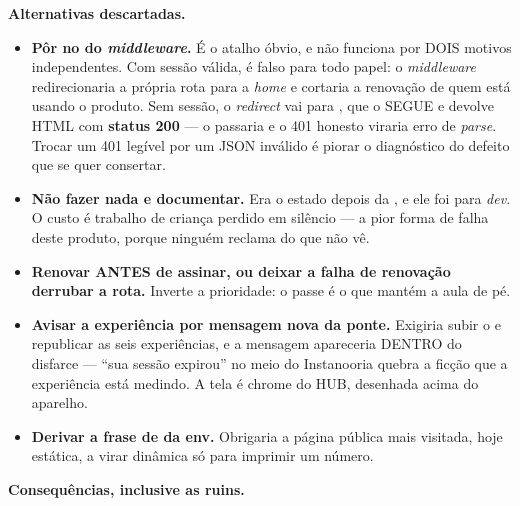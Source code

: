 \textbf{Alternativas descartadas.}
\begin{itemize}
  \item \textbf{Pôr  no  do
    \emph{middleware}.} É o atalho óbvio, e não funciona por DOIS motivos
    independentes. Com sessão válida,  é falso para todo papel: o \emph{middleware}
    redirecionaria a própria rota para a \emph{home} e cortaria a renovação de
    quem está usando o produto. Sem sessão, o \emph{redirect} vai para
    , que o  SEGUE e devolve HTML com \textbf{status
    200} --- o  passaria e o 401 honesto viraria erro de
    \emph{parse}. Trocar um 401 legível por um JSON inválido é piorar o
    diagnóstico do defeito que se quer consertar.
  \item \textbf{Não fazer nada e documentar.} Era o estado depois da
    , e ele foi para \emph{dev}. O custo é trabalho de criança
    perdido em silêncio --- a pior forma de falha deste produto, porque ninguém
    reclama do que não vê.
  \item \textbf{Renovar ANTES de assinar, ou deixar a falha de renovação
    derrubar a rota.} Inverte a prioridade: o passe é o que mantém a aula de
    pé.
  \item \textbf{Avisar a experiência por mensagem nova da ponte.} Exigiria subir
    o  e republicar as seis experiências, e a mensagem
    apareceria DENTRO do disfarce --- \enquote{sua sessão expirou} no meio do
    Instanooria quebra a ficção que a experiência está medindo. A tela é chrome
    do HUB, desenhada acima do aparelho.
  \item \textbf{Derivar a frase de  da env.} Obrigaria a
    página pública mais visitada, hoje estática, a virar dinâmica só para
    imprimir um número.
\end{itemize}

\textbf{Consequências, inclusive as ruins.}

